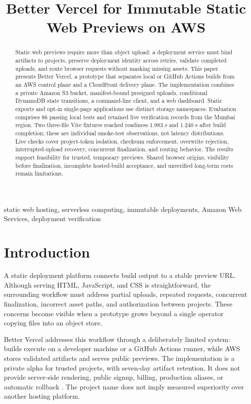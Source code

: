 \documentclass[conference,letterpaper]{IEEEtran}
\title{Better Vercel for Immutable Static Web Previews on AWS}
\begin{document}
\maketitle
\begin{abstract}
Static web previews require more than object upload: a deployment service must bind artifacts to projects, preserve deployment identity across retries, validate completed uploads, and route browser requests without masking missing assets. This paper presents Better Vercel, a prototype that separates local or GitHub Actions builds from an AWS control plane and a CloudFront delivery plane. The implementation combines a private Amazon S3 bucket, manifest-bound presigned uploads, conditional DynamoDB state transitions, a command-line client, and a web dashboard. Static exports and opt-in single-page applications use distinct storage namespaces. Evaluation comprises 86 passing local tests and retained live verification records from the Mumbai region. Two three-file Vite fixtures reached readiness 1.983 s and 1.240 s after build completion; these are individual smoke-test observations, not latency distributions. Live checks cover project-token isolation, checksum enforcement, overwrite rejection, interrupted-upload recovery, concurrent finalization, and routing behavior. The results support feasibility for trusted, temporary previews. Shared browser origins, visibility before finalization, incomplete hosted-build acceptance, and unverified long-term costs remain limitations.
\end{abstract}
\begin{IEEEkeywords}
static web hosting, serverless computing, immutable deployments, Amazon Web Services, deployment verification
\end{IEEEkeywords}
\section{Introduction}
A static deployment platform connects build output to a stable preview URL. Although serving HTML, JavaScript, and CSS is straightforward, the surrounding workflow must address partial uploads, repeated requests, concurrent finalization, incorrect asset paths, and authorization between projects. These concerns become visible when a prototype grows beyond a single operator copying files into an object store.

Better Vercel addresses this workflow through a deliberately limited system: builds execute on a developer machine or a GitHub Actions runner, while AWS stores validated artifacts and serves public previews. The implementation is a private alpha for trusted projects, with seven-day artifact retention. It does not provide server-side rendering, public signup, billing, production aliases, or automatic rollback \cite{r1}. The project name does not imply measured superiority over another hosting platform.
\end{document}

